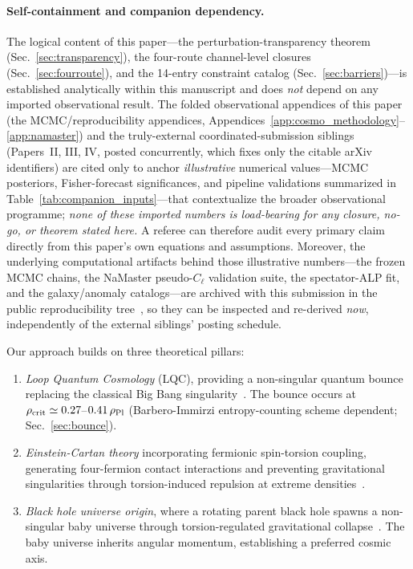 \documentclass[aps,prd,twocolumn,superscriptaddress,showpacs,preprintnumbers,nofootinbib,longbibliography,floatfix]{revtex4-2}
\newcommand{\rhocrit}{\rho_{\rm crit}}
\newcommand{\rhoPl}{\rho_{\rm Pl}}
\begin{document}
\paragraph{Self-containment and companion dependency.} The logical content
of this paper---the perturbation-transparency theorem
(Sec.~\ref{sec:transparency}), the four-route channel-level closures
(Sec.~\ref{sec:fourroute}), and the 14-entry constraint catalog
(Sec.~\ref{sec:barriers})---is established analytically within this manuscript
and does \emph{not} depend on any imported observational result. The folded
observational appendices of this paper (the MCMC/reproducibility appendices,
Appendices~\ref{app:cosmo_methodology}--\ref{app:namaster}) and the truly-external
coordinated-submission siblings (Papers~II, III, IV, posted concurrently, which
fixes only the citable arXiv identifiers) are cited only to anchor
\emph{illustrative} numerical values---MCMC posteriors, Fisher-forecast
significances, and pipeline validations summarized in
Table~\ref{tab:companion_inputs}---that contextualize the broader observational
programme; \emph{none of these imported numbers is load-bearing for
any closure, no-go, or theorem stated here.} A referee can therefore
audit every primary claim directly from
this paper's own equations and assumptions. Moreover, the underlying
computational artifacts behind those illustrative numbers---the frozen MCMC
chains, the NaMaster pseudo-$C_\ell$ validation suite, the spectator-ALP fit,
and the galaxy/anomaly catalogs---are archived with this submission in the
public reproducibility tree~\cite{BigBounceRepro}, so they can be inspected and
re-derived \emph{now}, independently of the external siblings' posting schedule.

Our approach builds on three theoretical pillars:

\begin{enumerate}[leftmargin=*]
\item \textit{Loop Quantum Cosmology} (LQC), providing a non-singular quantum
bounce replacing the classical Big Bang singularity~\cite{Ashtekar2011}. The
bounce occurs at $\rhocrit \simeq 0.27$--$0.41\,\rhoPl$
(Barbero-Immirzi entropy-counting scheme dependent; Sec.~\ref{sec:bounce}).

\item \textit{Einstein-Cartan theory} incorporating fermionic spin-torsion
coupling, generating four-fermion contact interactions and preventing
gravitational singularities through torsion-induced repulsion at extreme
densities~\cite{Hehl1976,Poplawski2012}.

\item \textit{Black hole universe origin}, where a rotating parent black hole
spawns a non-singular baby universe through torsion-regulated gravitational
collapse~\cite{Poplawski2016}. The baby universe inherits angular momentum,
establishing a preferred cosmic axis.
\end{enumerate}
\end{document}
